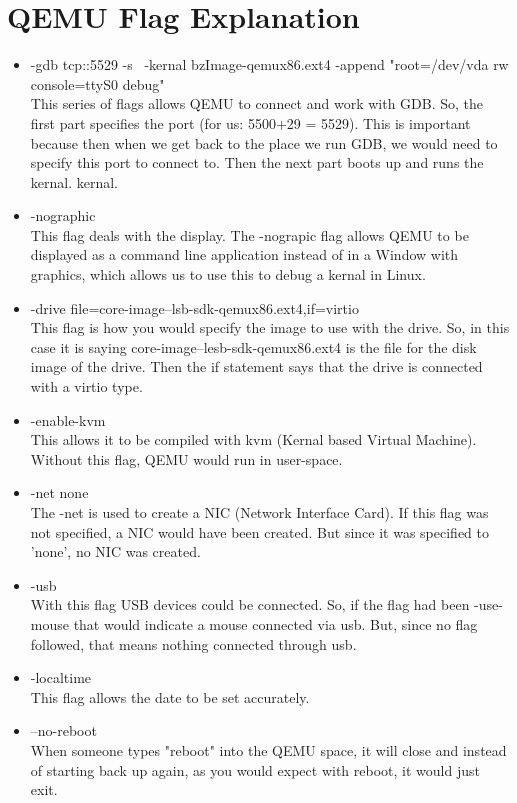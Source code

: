 \documentclass[10pt,draftclsnofoot]{article}
\begin{document}
\section{QEMU Flag Explanation}
\begin{itemize}
\item{-gdb tcp::5529 -s \ -kernal bzImage-qemux86.ext4 \--append "root=/dev/vda rw console=ttyS0 debug"} \\
This series of flags allows QEMU to connect and work with GDB. So, the first part 
specifies the port (for us: 5500+29 = 5529). This is important because then when we
get back to the place we run GDB, we would need to specify this port to connect to. 
Then the next part boots up and runs the kernal.
kernal. 
\item{-nographic} \\
This flag deals with the display. The -nograpic flag allows QEMU to be displayed as
a command line application instead of in a Window with graphics, which allows us to 
use this to debug a kernal in Linux. 
\item{-drive file=core-image--lsb-sdk-qemux86.ext4,if=virtio} \\
This flag is how you would specify the image to use with the drive. So, in this case
it is saying core-image--lesb-sdk-qemux86.ext4 is the file for the disk image of the 
drive. Then the if statement says that the drive is connected with a virtio type.
\item{-enable-kvm} \\
This allows it to be compiled with kvm (Kernal based Virtual Machine). Without this
flag, QEMU would run in user-space. 
\item{-net none} \\
The -net is used to create a NIC (Network Interface Card). If this flag was not 
specified, a NIC would have been created. But since it was specified to 'none', no NIC
was created.
\item{-usb} \\
With this flag USB devices could be connected. So, if the flag had been -use-mouse
that would indicate a mouse connected via usb. But, since no flag followed, that means
nothing connected through usb. 
\item{-localtime} \\
This flag allows the date to be set accurately.
\item{--no-reboot} \\ 
When someone types "reboot" into the QEMU space, it will close and instead of starting
back up again, as you would expect with reboot, it would just exit.
\end{itemize}
\end{document}
